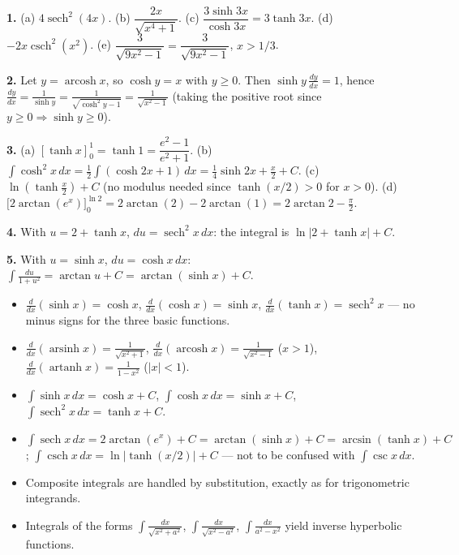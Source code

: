 \documentclass[11pt]{article}
\newcommand{\cle}[1]{{\popxbold\color{popdark}#1}}
\begin{document}
\begin{corrige}[Exercise 1]
\textbf{1.} (a) $4\operatorname{sech}^2(4x)$.
      (b) $\dfrac{2x}{\sqrt{x^4+1}}$.
      (c) $\dfrac{3\sinh 3x}{\cosh 3x} = 3\tanh 3x$.
      (d) $-2x\operatorname{csch}^2(x^2)$.
      (e) $\dfrac{3}{\sqrt{9x^2-1}} = \dfrac{3}{\sqrt{9x^2-1}}$, $x > 1/3$.

\textbf{2.} Let $y = \operatorname{arcosh} x$, so $\cosh y = x$ with $y \ge 0$. Then $\sinh y \, \frac{dy}{dx} = 1$, hence $\frac{dy}{dx} = \frac{1}{\sinh y} = \frac{1}{\sqrt{\cosh^2 y - 1}} = \frac{1}{\sqrt{x^2-1}}$ (taking the positive root since $y \ge 0 \Rightarrow \sinh y \ge 0$).

\textbf{3.} (a) $[\tanh x]_0^1 = \tanh 1 = \dfrac{e^2-1}{e^2+1}$.
      (b) $\int \cosh^2 x\,dx = \frac{1}{2}\int(\cosh 2x + 1)\,dx = \frac{1}{4}\sinh 2x + \frac{x}{2} + C$.
      (c) $\ln\left(\tanh\frac{x}{2}\right) + C$ (no modulus needed since $\tanh(x/2) > 0$ for $x > 0$).
      (d) $\Big[2\arctan(e^x)\Big]_0^{\ln 2} = 2\arctan(2) - 2\arctan(1) = 2\arctan 2 - \frac{\pi}{2}$.

\textbf{4.} With $u = 2 + \tanh x$, $du = \operatorname{sech}^2 x\,dx$: the integral is $\ln|2 + \tanh x| + C$.

\textbf{5.} With $u = \sinh x$, $du = \cosh x\,dx$: $\displaystyle\int \frac{du}{1+u^2} = \arctan u + C = \arctan(\sinh x) + C$.
\end{corrige}

\begin{aretenir}
\begin{itemize}
\item $\frac{d}{dx}(\sinh x) = \cosh x$, $\frac{d}{dx}(\cosh x) = \sinh x$, $\frac{d}{dx}(\tanh x) = \operatorname{sech}^2 x$ --- \cle{no minus signs} for the three basic functions.
\item $\frac{d}{dx}(\operatorname{arsinh} x) = \frac{1}{\sqrt{x^2+1}}$, $\frac{d}{dx}(\operatorname{arcosh} x) = \frac{1}{\sqrt{x^2-1}}$ ($x>1$), $\frac{d}{dx}(\operatorname{artanh} x) = \frac{1}{1-x^2}$ ($|x|<1$).
\item $\int \sinh x\,dx = \cosh x + C$, $\int \cosh x\,dx = \sinh x + C$, $\int \operatorname{sech}^2 x\,dx = \tanh x + C$.
\item $\int \operatorname{sech} x\,dx = 2\arctan(e^x) + C = \arctan(\sinh x) + C = \arcsin(\tanh x) + C$; $\int \operatorname{csch} x\,dx = \ln|\tanh(x/2)| + C$ --- not to be confused with $\int \csc x\,dx$.
\item Composite integrals are handled by substitution, exactly as for trigonometric integrands.
\item Integrals of the forms $\int \frac{dx}{\sqrt{x^2+a^2}}$, $\int \frac{dx}{\sqrt{x^2-a^2}}$, $\int \frac{dx}{a^2-x^2}$ yield inverse hyperbolic functions.
\end{itemize}
\end{aretenir}
\end{document}
